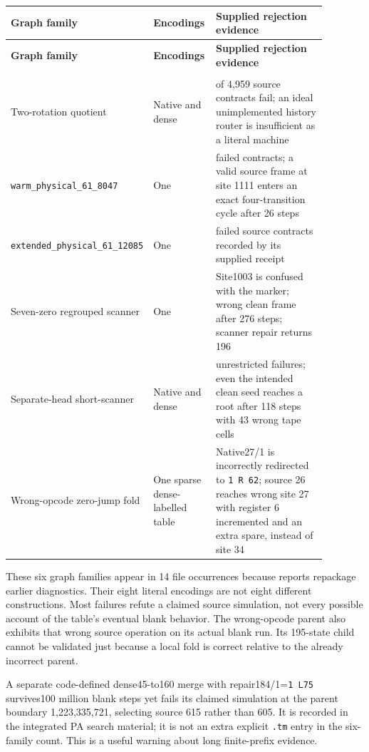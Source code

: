 \begingroup\footnotesize\setlength{\tabcolsep}{3pt}
\renewcommand{\arraystretch}{1.14}
\begin{longtable}{@{}>{\raggedright\arraybackslash}p{0.29\linewidth}>{\raggedright\arraybackslash}p{0.2\linewidth}>{\raggedright\arraybackslash}p{0.39\linewidth}@{}}
\toprule
\textbf{Graph family} & \textbf{Encodings} & \textbf{Supplied rejection evidence}\\
\midrule\endfirsthead
\toprule
\textbf{Graph family} & \textbf{Encodings} & \textbf{Supplied rejection evidence}\\
\midrule\endhead
\midrule\multicolumn{3}{r}{\emph{Continued on next page}}\\\endfoot
\bottomrule\endlastfoot
Two-rotation quotient & Native and dense & 93 of 4,959 source contracts fail; an ideal unimplemented history router is insufficient as a literal machine\\
\nolinkurl{warm_physical_61_8047} & One & 714 failed contracts; a valid source frame at site 1111 enters an exact four-transition cycle after 26 steps\\
\nolinkurl{extended_physical_61_12085} & One & 777 failed source contracts recorded by its supplied receipt\\
Seven-zero regrouped scanner & One & Site1003 is confused with the marker; wrong clean frame after 276 steps; scanner repair returns 196\\
Separate-head short-scanner & Native and dense & 96 unrestricted failures; even the intended clean seed reaches a root after 118 steps with 43 wrong tape cells\\
Wrong-opcode zero-jump fold & One sparse dense-labelled table & Native27/1 is incorrectly redirected to \nolinkurl{1 R 62}; source 26 reaches wrong site 27 with register 6 incremented and an extra spare, instead of site 34\\
\end{longtable}
\endgroup

These six graph families appear in 14 file occurrences because reports
repackage earlier diagnostics. Their eight literal encodings are not eight
different constructions. Most failures refute a claimed source simulation,
not every possible account of the table's eventual blank behavior. The
wrong-opcode parent also exhibits that wrong source operation on its actual
blank run. Its 195-state child cannot be validated just because a local
fold is correct relative to the already incorrect parent.

A separate code-defined dense45-to160 merge with repair184/1=\nolinkurl{1 L75}
survives100 million blank steps yet fails its claimed simulation at the
parent boundary 1,223,335,721, selecting source 615 rather than 605. It is
recorded in the integrated PA search material; it is not an extra explicit
\nolinkurl{.tm} entry in the six-family count. This is a useful warning about long
finite-prefix evidence.

